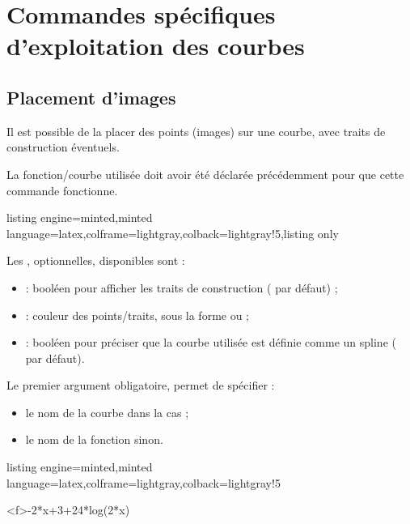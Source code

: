 \documentclass[11pt,a4paper]{ltxdoc}
\begin{document}
\pagebreak

\section{Commandes spécifiques d'exploitation des courbes}

\subsection{Placement d'images}\label{images}

Il est possible de la placer des points (images) sur une courbe, avec traits de construction éventuels.

La fonction/courbe utilisée doit avoir été déclarée précédemment pour que cette commande fonctionne.

\begin{tcblisting}{listing engine=minted,minted language=latex,colframe=lightgray,colback=lightgray!5,listing only}
\end{tcblisting}

Les \MontreCode{[clés]}, optionnelles, disponibles sont :

\smallskip

\begin{itemize}
  \item {} : booléen pour afficher les traits de construction ( par défaut) ;
  \item {} : couleur des points/traits, sous la forme  ou  ;
  \item {} : booléen pour préciser que la courbe utilisée est définie comme un \textsf{spline} ( par défaut).
\end{itemize}

\smallskip

Le premier argument obligatoire, permet de spécifier :

\smallskip

\begin{itemize}
  \item le nom de la courbe dans la cas  ;
  \item le nom de la fonction sinon.
\end{itemize}

\begin{tcblisting}{listing engine=minted,minted language=latex,colframe=lightgray,colback=lightgray!5}
\begin{GraphiqueTikz}%
  [x=0.9cm,y=0.425cm,Xmin=4,Xmax=20,Origx=4,
  Ymin=40,Ymax=56,Ygrille=2,Ygrilles=1,Origy=40]
  \DefinirCourbe[Nom=cf,Debut=5,Fin=19,Trace,Couleur=red]<f>{-2*x+3+24*log(2*x)}
\end{GraphiqueTikz}
\end{tcblisting}
\end{document}
